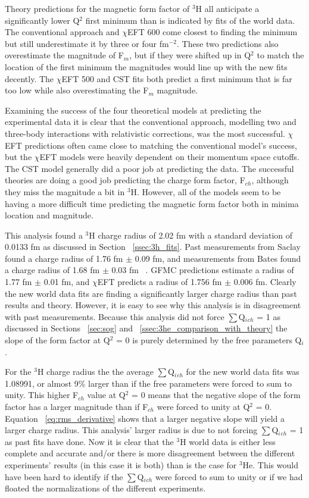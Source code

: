 Theory predictions for the magnetic form factor of $^3$H all anticipate a significantly lower Q$^2$ first minimum than is indicated by fits of the world data. The conventional approach and $\chi$EFT 600 come closest to finding the minimum but still underestimate it by three or four fm$^{-2}$. These two predictions also overestimate the magnitude of F$_m$, but if they were shifted up in Q$^2$ to match the location of the first minimum the magnitudes would line up with the new fits decently. The $\chi$EFT 500 and CST fits both predict a first minimum that is far too low while also overestimating the F$_m$ magnitude. 

Examining the success of the four theoretical models at predicting the experimental data it is clear that the conventional approach, modelling two and three-body interactions with relativistic corrections, was the most successful. $\chi$EFT predictions often came close to matching the conventional model's success, but the $\chi$EFT models were heavily dependent on their momentum space cutoffs. The CST model generally did a poor job at predicting the data. The successful theories are doing a good job predicting the charge form factor, F$_{ch}$, although they miss the magnitude a bit in $^3$H. However, all of the models seem to be having a more difficult time predicting the magnetic form factor both in minima location and magnitude.

This analysis found a $^3$H charge radius of 2.02 fm with a standard deviation of 0.0133 fm as discussed in Section ~\ref{ssec:3h_fits}. Past measurements from Saclay found a charge radius of 1.76 fm $\pm$ 0.09 fm, and measurements from Bates found a charge radius of 1.68 fm $\pm$ 0.03 fm ~\cite{3h_proposal}. GFMC predictions estimate a radius of 1.77 fm $\pm$ 0.01 fm, and $\chi$EFT predicts a radius of 1.756 fm $\pm$ 0.006 fm. Clearly the new world data fits are finding a significantly larger charge radius than past results and theory. However, it is easy to see why this analysis is in disagreement with past measurements. Because this analysis did not force $\sum$Q$_i{_{ch}}$ = 1 as discussed in Sections ~\ref{sec:sog} and ~\ref{ssec:3he_comparison_with_theory} the slope of the form factor at Q$^2$ = 0 is purely determined by the free parameters Q$_i$. 

For the $^3$H charge radius the the average $\sum$Q$_i{_{ch}}$ for the new world data fits was 1.08991, or almost 9$\%$ larger than if the free parameters were forced to sum to unity. This higher F$_{ch}$ value at Q$^2$ = 0 means that the negative slope of the form factor has a larger magnitude than if F$_{ch}$ were forced to unity at Q$^2$ = 0. Equation ~\ref{eq:rms_derivative} shows that a larger negative slope will yield a larger charge radius. This analysis' larger radius is due to not forcing $\sum$Q$_i{_{ch}}$ = 1 as past fits have done. Now it is clear that the $^3$H world data is either less complete and accurate and/or there is more disagreement between the different experiments' results (in this case it is both) than is the case for $^3$He. This would have been hard to identify if the $\sum$Q$_i{_{ch}}$ were forced to sum to unity or if we had floated the normalizations of the different experiments.

